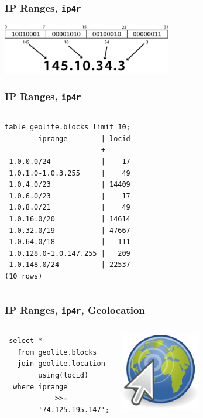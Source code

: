\documentclass{beamer}
\begin{document}
\begin{frame}[fragile]
  \frametitle{IP Ranges, \texttt{ip4r}}

\begin{center}
  \includegraphics[height=6em]{ip-address.png}
\end{center}
\end{frame}

\begin{frame}[fragile]
  \frametitle{IP Ranges, \texttt{ip4r}}

\begin{columns}
\begin{verbatim}
table geolite.blocks limit 10;
        iprange        | locid 
-----------------------+-------
 1.0.0.0/24            |    17
 1.0.1.0-1.0.3.255     |    49
 1.0.4.0/23            | 14409
 1.0.6.0/23            |    17
 1.0.8.0/21            |    49
 1.0.16.0/20           | 14614
 1.0.32.0/19           | 47667
 1.0.64.0/18           |   111
 1.0.128.0-1.0.147.255 |   209
 1.0.148.0/24          | 22537
(10 rows)
\end{verbatim}
\end{columns}
\end{frame}

\begin{frame}[fragile]
  \frametitle{IP Ranges, \texttt{ip4r}, Geolocation}

  \vfill

\begin{columns}
\begin{verbatim}
 select *
   from geolite.blocks
   join geolite.location
        using(locid)
  where iprange
            >>=
        '74.125.195.147';
\end{verbatim}
\begin{center}
  \includegraphics[height=9em]{geolocation-clic.png}
\end{center}
\end{columns}
\end{frame}
\end{document}
